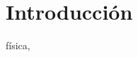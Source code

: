 \documentclass[journal]{IEEEtran}
\begin{document}
\maketitle

\begin{abstract}


\end{abstract}

\renewcommand{\IEEEkeywordsname}{Palabras Clave}
\begin{IEEEkeywords}
\end{IEEEkeywords}

\section{Introducción}

 física, 

\end{document}
